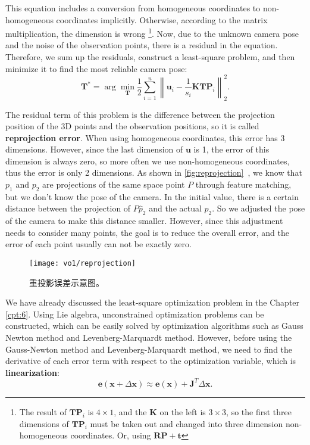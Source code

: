 This equation includes a conversion from homogeneous coordinates to non-homogeneous coordinates implicitly. Otherwise, according to the matrix multiplication, the dimension is wrong \footnote{The result of $ \mathbf{T} {\mathbf{P}_i}$ is $4 \times 1$, and the $\mathbf{K}$ on the left is $3 \times 3$, so the first three dimensions of $\mathbf{T}\mathbf{P}_i$ must be taken out and changed into three dimension non-homogeneous coordinates. Or, using $\mathbf{R}\mathbf{P}+\mathbf{t}$}. Now, due to the unknown camera pose and the noise of the observation points, there is a residual in the equation. Therefore, we sum up the residuals, construct a least-square problem, and then minimize it to find the most reliable camera pose:
\begin{equation}
{\mathbf{T}^*} = \arg \mathop {\min }\limits_{\mathbf{T}}  \frac{1}{2}\sum\limits_{i = 1}^n {\left\| {{{\mathbf{u}}_i} - \frac{1}{s_i} \mathbf{K}\mathbf{T}{\mathbf{P}}_i} \right\|_2^2} .
\end{equation}

The residual term of this problem is the difference between the projection position of the 3D points and the observation positions, so it is called \textbf{reprojection error}. When using homogeneous coordinates, this error has 3 dimensions. However, since the last dimension of ${\mathbf{u}}$ is 1, the error of this dimension is always zero, so more often we use non-homogeneous coordinates, thus the error is only 2 dimensions. As shown in \autoref{fig:reprojection}~, we know that $p_1$ and $p_2$ are projections of the same space point $P$ through feature matching, but we don't know the pose of the camera. In the initial value, there is a certain distance between the projection of $P \hat{p}_2$ and the actual $p_2$. So we adjusted the pose of the camera to make this distance smaller. However, since this adjustment needs to consider many points, the goal is to reduce the overall error, and the error of each point usually can not be exactly zero.

\begin{figure}[!htp]
	\centering
	\texttt{[image: vo1/reprojection]}
	\caption{重投影误差示意图。}
	\label{fig:reprojection}
\end{figure}

We have already discussed the least-square optimization problem in the Chapter \ref{cpt:6}. Using Lie algebra, unconstrained optimization problems can be constructed, which can be easily solved by optimization algorithms such as Gauss Newton method and Levenberg-Marquardt method. However, before using the Gauss-Newton method and Levenberg-Marquardt method, we need to find the derivative of each error term with respect to the optimization variable, which is \textbf{linearization}:
\begin{equation}
\mathbf{e}( \mathbf{x} + \Delta \mathbf{x} ) \approx \mathbf{e}(\mathbf{x}) + \mathbf{J} ^T\Delta \mathbf{x}.
\end{equation}

